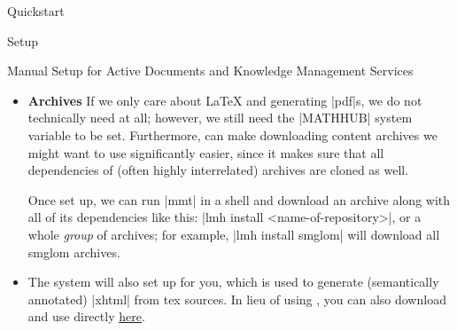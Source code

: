\begin{sfragment}{Quickstart}
\begin{sfragment}{Setup}
\begin{sfragment}{Manual Setup for Active Documents and Knowledge Management Services}
\begin{itemize}
          Following the setup routine (Step 3) will entail designating
          a |MathHub|-directory on your local file system, where
          the \mmt system will look for \sTeX/\mmt content archives.

        \item \textbf{\sTeX Archives} If we only care about {\LaTeX} and generating
          |pdf|s, we do not technically need \mmt at all; however, we still need the
          |MATHHUB| system variable to be set. Furthermore, \mmt can make downloading
          content archives we might want to use significantly easier, since it makes sure
          that all dependencies of (often highly interrelated) \sTeX archives are cloned
          as well.

          Once set up, we can run |mmt| in a shell and download an archive along with all
          of its dependencies like this: |lmh install <name-of-repository>|, or a whole
          \emph{group} of archives; for example, |lmh install smglom| will download all
          smglom archives.
        \item \textbf{\RusTeX} The \mmt system will also set up \RusTeX for you, which is
          used to generate (semantically annotated) |xhtml| from tex sources. In lieu of
          using \mmt, you can also download and use \RusTeX directly
          \href{https://github.com/slatex/RusTeX}{here}.
      \end{itemize}
    \end{sfragment}
  \end{sfragment}

  

\end{sfragment}

